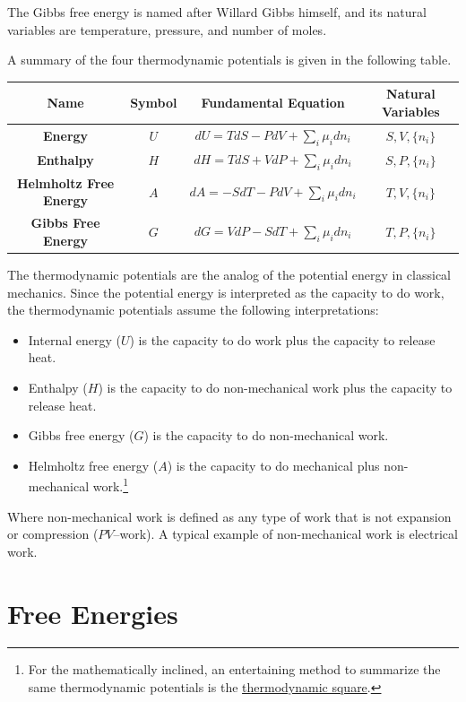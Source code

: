 \documentclass[
  9pt,
]{extbook}
\providecommand{\tightlist}{%
  \setlength{\itemsep}{0pt}\setlength{\parskip}{0pt}}
\theoremstyle{definition}
\theoremstyle{definition}
\theoremstyle{definition}
\theoremstyle{remark}
\begin{document}
The Gibbs free energy is named after Willard Gibbs himself, and its natural variables are temperature, pressure, and number of moles.

A summary of the four thermodynamic potentials is given in the following table.

\tiny

\begin{longtable}[]{@{}cccc@{}}
\toprule
\textbf{Name} & \textbf{Symbol} & \textbf{Fundamental Equation} & \textbf{Natural Variables}\tabularnewline
\midrule
\endhead
\textbf{Energy} & \(U\) & \(dU=TdS-PdV+\sum_i\mu_i dn_i\) & \(S,V,\{n_i\}\)\tabularnewline
\textbf{Enthalpy} & \(H\) & \(dH=TdS+VdP+\sum_i\mu_i dn_i\) & \(S,P,\{n_i\}\)\tabularnewline
\textbf{Helmholtz Free Energy} & \(A\) & \(dA=-SdT-PdV+\sum_i\mu_i dn_i\) & \(T,V,\{n_i\}\)\tabularnewline
\textbf{Gibbs Free Energy} & \(G\) & \(dG=VdP-SdT+\sum_i\mu_i dn_i\) & \(T,P,\{n_i\}\)\tabularnewline
\bottomrule
\end{longtable}

\normalsize

The thermodynamic potentials are the analog of the potential energy in classical mechanics. Since the potential energy is interpreted as the capacity to do work, the thermodynamic potentials assume the following interpretations:

\begin{itemize}
\tightlist
\item
  Internal energy (\(U\)) is the capacity to do work plus the capacity to release heat.
\item
  Enthalpy (\(H\)) is the capacity to do non-mechanical work plus the capacity to release heat.
\item
  Gibbs free energy (\(G\)) is the capacity to do non-mechanical work.
\item
  Helmholtz free energy (\(A\)) is the capacity to do mechanical plus non-mechanical work.\footnote{For the mathematically inclined, an entertaining method to summarize the same thermodynamic potentials is the \href{https://en.wikipedia.org/wiki/Thermodynamic_square}{thermodynamic square}.}
\end{itemize}

Where non-mechanical work is defined as any type of work that is not expansion or compression (\(PV\)--work). A typical example of non-mechanical work is electrical work.

\hypertarget{freeenergies}{%
\section{Free Energies}\label{freeenergies}}
\end{document}

